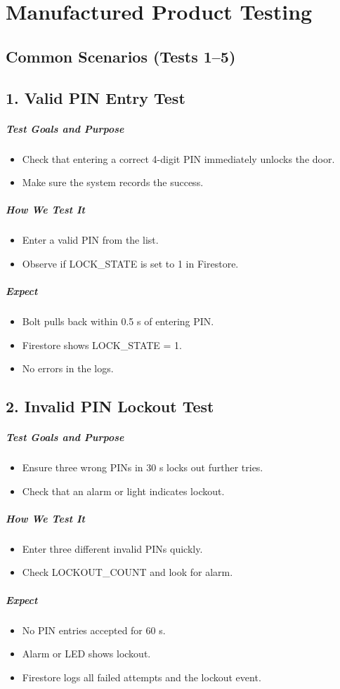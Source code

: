 \newpage
\section{Manufactured Product Testing}

\subsection*{Common Scenarios (Tests 1–5)}

\subsection*{1. Valid PIN Entry Test}
\subparagraph{Test Goals and Purpose}
\begin{itemize}
    \item Check that entering a correct 4-digit PIN immediately unlocks the door.
    \item Make sure the system records the success.
\end{itemize}
\subparagraph{How We Test It}
\begin{itemize}
    \item Enter a valid PIN from the list.
    \item Observe if LOCK\_STATE is set to 1 in Firestore.
\end{itemize}
\subparagraph{ Expect}
\begin{itemize}
    \item Bolt pulls back within 0.5 s of entering PIN.
    \item Firestore shows LOCK\_STATE = 1.
    \item No errors in the logs.
\end{itemize}

\subsection*{2. Invalid PIN Lockout Test}
\subparagraph{Test Goals and Purpose}
\begin{itemize}
    \item Ensure three wrong PINs in 30 s locks out further tries.
    \item Check that an alarm or light indicates lockout.
\end{itemize}
\subparagraph{How We Test It}
\begin{itemize}
    \item Enter three different invalid PINs quickly.
    \item Check LOCKOUT\_COUNT and look for alarm.
\end{itemize}
\subparagraph{ Expect}
\begin{itemize}
    \item No PIN entries accepted for 60 s.
    \item Alarm or LED shows lockout.
    \item Firestore logs all failed attempts and the lockout event.
\end{itemize}

